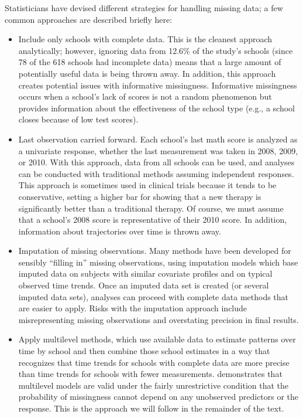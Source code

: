 \documentclass[
]{krantz}
\providecommand{\tightlist}{%
  \setlength{\itemsep}{0pt}\setlength{\parskip}{0pt}}
\begin{document}
Statisticians have devised different strategies for handling missing data; a few common approaches are described briefly here:

\begin{itemize}
\tightlist
\item
  Include only schools with complete data. This is the cleanest approach analytically; however, ignoring data from 12.6\% of the study's schools (since 78 of the 618 schools had incomplete data) means that a large amount of potentially useful data is being thrown away. In addition, this approach creates potential issues with informative missingness. Informative missingness occurs when a school's lack of scores is not a random phenomenon but provides information about the effectiveness of the school type (e.g., a school closes because of low test scores).
\item
  Last observation carried forward. Each school's last math score is analyzed as a univariate response, whether the last measurement was taken in 2008, 2009, or 2010. With this approach, data from all schools can be used, and analyses can be conducted with traditional methods assuming independent responses. This approach is sometimes used in clinical trials because it tends to be conservative, setting a higher bar for showing that a new therapy is significantly better than a traditional therapy. Of course, we must assume that a school's 2008 score is representative of their 2010 score. In addition, information about trajectories over time is thrown away.
\item
  Imputation of missing observations. Many methods have been developed for sensibly ``filling in'' missing observations, using imputation models which base imputed data on subjects with similar covariate profiles and on typical observed time trends. Once an imputed data set is created (or several imputed data sets), analyses can proceed with complete data methods that are easier to apply. Risks with the imputation approach include misrepresenting missing observations and overstating precision in final results.
\item
  Apply multilevel methods, which use available data to estimate patterns over time by school and then combine those school estimates in a way that recognizes that time trends for schools with complete data are more precise than time trends for schools with fewer measurements. \citet{Laird1988} demonstrates that multilevel models are valid under the fairly unrestrictive condition that the probability of missingness cannot depend on any unobserved predictors or the response. This is the approach we will follow in the remainder of the text.
\end{itemize}
\end{document}
